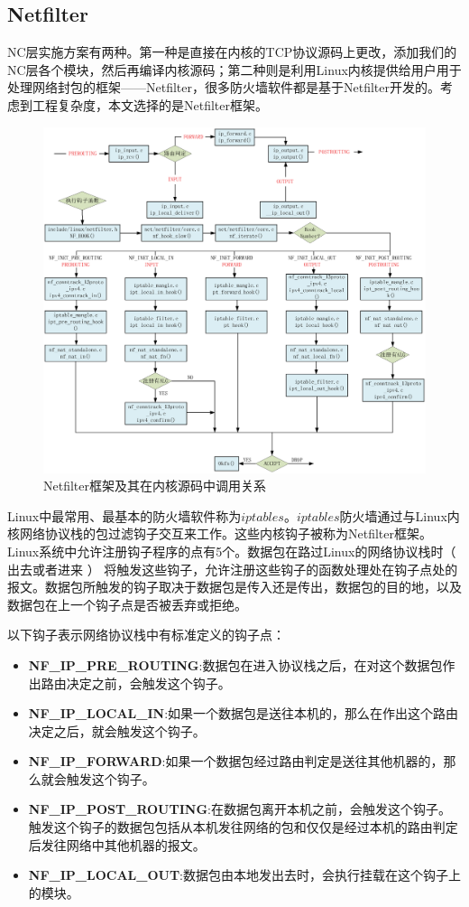 \subsection{Netfilter}
NC层实施方案有两种。第一种是直接在内核的TCP协议源码上更改，添加我们的NC层各个模块，然后再编译内核源码；第二种则是利用Linux内核提供给用户用于处理网络封包的框架——Netfilter，很多防火墙软件都是基于Netfilter开发的。考虑到工程复杂度，本文选择的是Netfilter框架。
\begin{figure}[htbp]
	\centering
	\includegraphics[width=6in]{figures/packetflow.eps}
	\caption{Netfilter框架及其在内核源码中调用关系}
	\label{NETFILTER_EPS}
\end{figure}
Linux中最常用、最基本的防火墙软件称为$iptables$。$iptables$防火墙通过与Linux内核网络协议栈的包过滤钩子交互来工作。这些内核钩子被称为Netfilter框架。Linux系统中允许注册钩子程序的点有5个。数据包在路过Linux的网络协议栈时（ 出去或者进来 ） 将触发这些钩子，允许注册这些钩子的函数处理处在钩子点处的报文。数据包所触发的钩子取决于数据包是传入还是传出，数据包的目的地，以及数据包在上一个钩子点是否被丢弃或拒绝。
\par
以下钩子表示网络协议栈中有标准定义的钩子点：
\begin{itemize}[leftmargin=.5in]
	\item \textbf{NF\_IP\_PRE\_ROUTING}:数据包在进入协议栈之后，在对这个数据包作出路由决定之前，会触发这个钩子。
	\item \textbf{NF\_IP\_LOCAL\_IN}:如果一个数据包是送往本机的，那么在作出这个路由决定之后，就会触发这个钩子。
	\item \textbf{NF\_IP\_FORWARD}:如果一个数据包经过路由判定是送往其他机器的，那么就会触发这个钩子。
	\item \textbf{NF\_IP\_POST\_ROUTING}:在数据包离开本机之前，会触发这个钩子。触发这个钩子的数据包包括从本机发往网络的包和仅仅是经过本机的路由判定后发往网络中其他机器的报文。
	\item \textbf{NF\_IP\_LOCAL\_OUT}:数据包由本地发出去时，会执行挂载在这个钩子上的模块。
\end{itemize}
